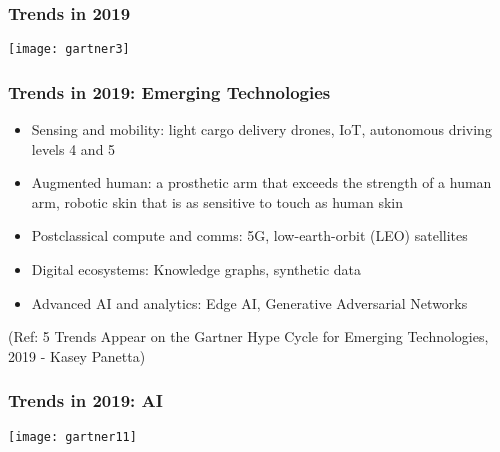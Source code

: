 \begin{frame}[fragile]\frametitle{Trends in 2019}

\begin{center}
\texttt{[image: gartner3]}
\end{center}

\end{frame}

\begin{frame}[fragile]\frametitle{Trends in 2019: Emerging Technologies}
\begin{itemize}
\item Sensing and mobility: light cargo delivery drones, IoT, autonomous driving levels 4 and 5
\item Augmented human: a prosthetic arm that exceeds the strength of a human arm, robotic skin that is as sensitive to touch as human skin
\item Postclassical compute and comms: 5G,  low-earth-orbit (LEO) satellites 
\item Digital ecosystems: Knowledge graphs, synthetic data
\item Advanced AI and analytics: Edge AI, Generative Adversarial Networks

\end{itemize}


{\tiny (Ref: 5 Trends Appear on the Gartner Hype Cycle for Emerging Technologies, 2019 - Kasey Panetta)}

\end{frame}


\begin{frame}[fragile]\frametitle{Trends in 2019: AI}

\begin{center}
\texttt{[image: gartner11]}
\end{center}

\end{frame}


